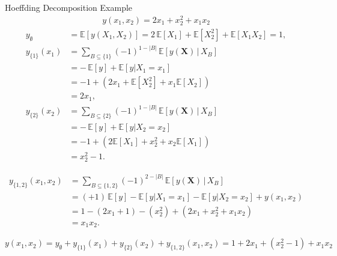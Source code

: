 \begin{frame}{Hoeffding Decomposition Example} %
  \begin{align*}
    y(x_1, x_2) = 2x_1 + x_2^{2} + x_1 x_2
  \end{align*}
  \begin{align*}
    y_{\emptyset}
    &= \mathbb{E}[y(X_1,X_2)] 
     = 2\,\mathbb{E}[X_1] + \mathbb{E}[X_2^2] + \mathbb{E}[X_1 X_2] 
     = 1,
    \\[1.2em]
    y_{\{1\}}(x_1)
    &= \sum_{B \subseteq \{1\}} (-1)^{1-|B|}
       \,\mathbb{E}[y(\boldsymbol{X})\,|\,X_B] \\[2pt]
    &= -\,\mathbb{E}[y] + \mathbb{E}[y|X_1=x_1] \\[2pt]
    &= -1 + (2x_1 + \mathbb{E}[X_2^2] + x_1\mathbb{E}[X_2]) \\[2pt]
    &= 2x_1,
    \\[1.2em]
    y_{\{2\}}(x_2)
    &= \sum_{B \subseteq \{2\}} (-1)^{1-|B|}
       \,\mathbb{E}[y(\boldsymbol{X})\,|\,X_B] \\[2pt]
    &= -\,\mathbb{E}[y] + \mathbb{E}[y|X_2=x_2] \\[2pt]
    &= -1 + (2\mathbb{E}[X_1] + x_2^2 + x_2\mathbb{E}[X_1]) \\[2pt]
    &= x_2^2 - 1.
\end{align*}
\end{frame}

\begin{frame}
  \begin{align*}
    y_{\{1,2\}}(x_1,x_2)
    &= \sum_{B \subseteq \{1,2\}} (-1)^{2-|B|}
       \,\mathbb{E}[y(\boldsymbol{X})\,|\,X_B] \\[2pt]
    &= (+1)\,\mathbb{E}[y] 
     - \mathbb{E}[y|X_1=x_1]
     - \mathbb{E}[y|X_2=x_2]
     + y(x_1,x_2) \\[2pt]
    &= 1 - (2x_1+1) - (x_2^2) + (2x_1+x_2^2+x_1x_2) \\[2pt]
    &= x_1 x_2.
\end{align*}

\[
y(x_1,x_2)
= y_{\emptyset} + y_{\{1\}}(x_1) + y_{\{2\}}(x_2) + y_{\{1,2\}}(x_1,x_2)
= 1 + 2x_1 + (x_2^2 - 1) + x_1 x_2
\]

\end{frame}


